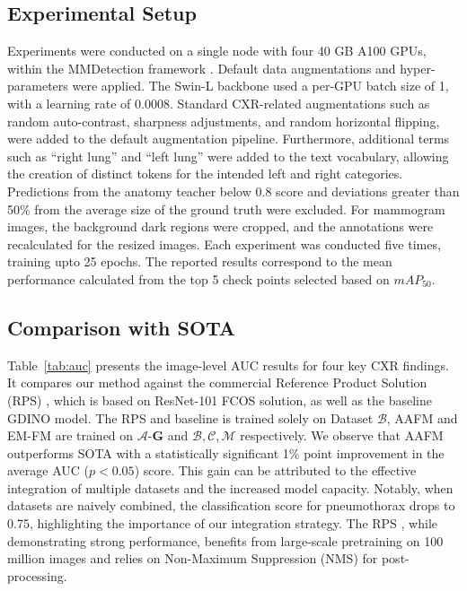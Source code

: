 \documentclass[runningheads]{llncs}
\begin{document}
\subsection{Experimental Setup}
Experiments were conducted on a single node with four 40 GB A100 GPUs, within the MMDetection framework \cite{chen2019mmdetection}. Default data augmentations and hyper-parameters were applied. The Swin-L backbone used a per-GPU batch size of 1, with a learning rate of 0.0008. Standard CXR-related augmentations such as random auto-contrast, sharpness adjustments, and random horizontal flipping, were added to the default augmentation pipeline. Furthermore, additional terms such as ``right lung'' and ``left lung'' were added to the text vocabulary, allowing the creation of distinct tokens for the intended left and right categories. Predictions from the anatomy teacher below 0.8 score and deviations greater than 50\% from the average size of the ground truth were excluded. For mammogram images, the background dark regions were cropped, and the annotations were recalculated for the resized images. Each experiment was conducted five times, training upto 25 epochs. The reported results correspond to the mean performance calculated from the top 5 check points selected based on $mAP_{50}$. 

\subsection{Comparison with SOTA}



Table~\ref{tab:auc} presents the image-level AUC results for four key CXR findings. It compares our method against the commercial Reference Product Solution (RPS) \cite{ghesu2022contrastive}, which is based on ResNet-101 FCOS \cite{tian2020fcos} solution, as well as the baseline GDINO model. The RPS and baseline is trained solely on Dataset $\mathcal{B}$, AAFM and EM-FM are trained on $\mathcal{A}$-\textbf{G} and $\mathcal{B},\mathcal{C},\mathcal{M}$ respectively. We observe that AAFM outperforms SOTA with a statistically significant 1\% point improvement in the average AUC ($p < 0.05$) score. This gain can be attributed to the effective integration of multiple datasets and the increased model capacity. Notably, when datasets are naively combined, the classification score for pneumothorax drops to 0.75, highlighting the importance of our integration strategy. The RPS \cite{ghesu2022contrastive}, while demonstrating strong performance, benefits from large-scale pretraining on 100 million images and relies on Non-Maximum Suppression (NMS) for post-processing. 
\end{document}
